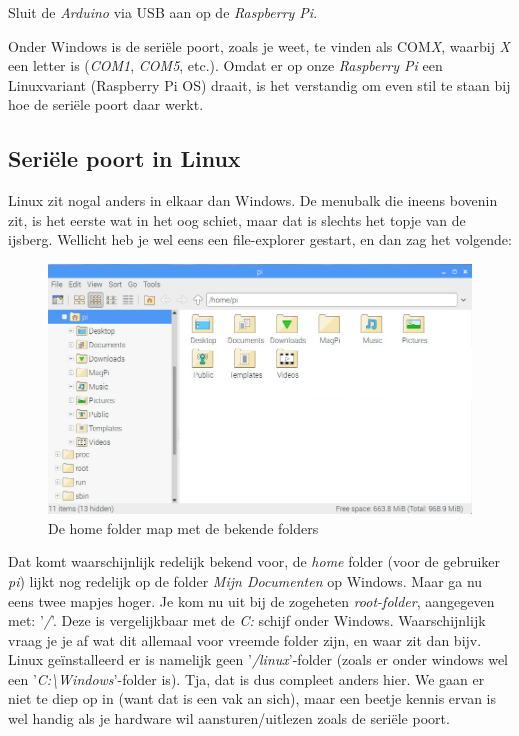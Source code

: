 \begin{exercise}
  Sluit de \textit{Arduino} via USB aan op de \textit{Raspberry Pi}.
\end{exercise}
Onder Windows is de seriële poort, zoals je weet, te vinden als COM\textit{X}, waarbij \textit{X} een letter is (\textit{COM1}, \textit{COM5}, etc.). Omdat er op onze \textit{Raspberry Pi} een Linuxvariant (Raspberry Pi OS) draait, is het verstandig om even stil te staan bij hoe de seriële poort daar werkt.\newline

\newpage 

\subsection{Seriële poort in Linux}
Linux zit nogal anders in elkaar dan Windows. De menubalk die ineens bovenin zit, is het eerste wat in het oog schiet, maar dat is slechts het topje van de ijsberg. Wellicht heb je wel eens een file-explorer gestart, en dan zag het volgende: 
\begin{figure}[h!]
\centering\includegraphics[scale=0.35]{Pictures/chapter08/home_folder.png}
  \caption{\small De home folder map met de bekende folders} 
\label{fig:home_folder} %
\end{figure}

Dat komt waarschijnlijk redelijk bekend voor, de \textit{home} folder (voor de gebruiker \textit{pi}) lijkt nog redelijk op de folder \textit{Mijn Documenten} op Windows. Maar ga nu eens twee mapjes hoger. Je kom nu uit bij de zogeheten \textit{root-folder}, aangegeven met: '\textit{/}'. Deze is vergelijkbaar met de \textit{C:} schijf onder Windows. 
Waarschijnlijk vraag je je af wat dit allemaal voor vreemde folder zijn, en waar zit dan bijv. Linux geïnstalleerd er is namelijk geen '\textit{/linux}'-folder (zoals er onder windows wel een '\textit{C:\textbackslash Windows}'-folder is). Tja, dat is dus compleet anders hier. We gaan er niet te diep op in (want dat is een vak an sich), maar een beetje kennis ervan is wel handig als je hardware wil aansturen/uitlezen zoals de seriële poort.\newline

